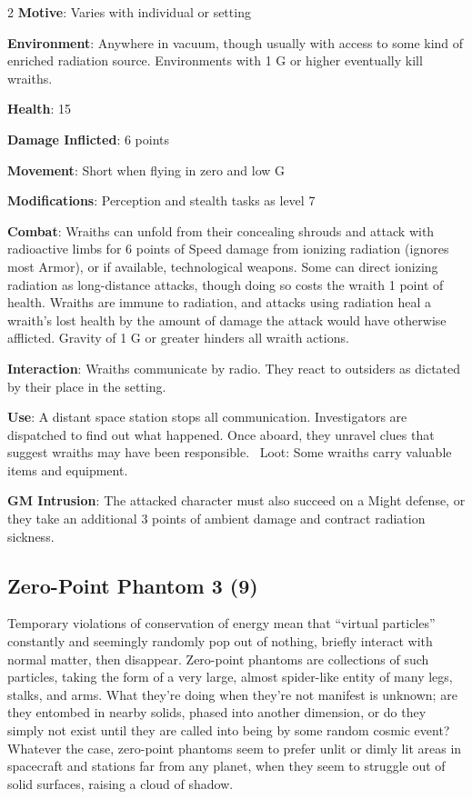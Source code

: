 \begin{multicols}{2}
\textbf{Motive}: Varies with individual or setting 

\textbf{Environment}: Anywhere in vacuum, though usually with access to some kind of enriched radiation source. Environments with 1 G or higher eventually kill wraiths. 

\textbf{Health}: 15 

\textbf{Damage Inflicted}: 6 points 

\textbf{Movement}: Short when flying in zero and low G 

\textbf{Modifications}: Perception and stealth tasks as level 7 

\textbf{Combat}: Wraiths can unfold from their concealing shrouds and attack with radioactive limbs for 6 points of Speed damage from ionizing radiation (ignores most Armor), or if available, technological weapons. Some can direct ionizing radiation as long-distance attacks, though doing so costs the wraith 1 point of health. Wraiths are immune to radiation, and attacks using radiation heal a wraith’s lost health by the amount of damage the attack would have otherwise afflicted. Gravity of 1 G or greater hinders all wraith actions. 

\textbf{Interaction}: Wraiths communicate by radio. They react to outsiders as dictated by their place in the setting. 

\textbf{Use}: A distant space station stops all communication. Investigators are dispatched to find out what happened. Once aboard, they unravel clues that suggest wraiths may have been responsible. 
Loot: Some wraiths carry valuable items and equipment.

\textbf{GM Intrusion}: The attacked character must also succeed on a Might defense, or they take an additional 3 points of ambient damage and contract radiation sickness.

\subsection{Zero-Point Phantom 3 (9)}

Temporary violations of conservation of energy mean that “virtual particles” constantly and seemingly randomly pop out of nothing, briefly interact with normal matter, then disappear. Zero-point phantoms are collections of such particles, taking the form of a very large, almost spider-like entity of many legs, stalks, and arms. What they’re doing when they’re not manifest is unknown; are they entombed in nearby solids, phased into another dimension, or do they simply not exist until they are called into being by some random cosmic event? Whatever the case, zero-point phantoms seem to prefer unlit or dimly lit areas in spacecraft and stations far from any planet, when they seem to struggle out of solid surfaces, raising a cloud of shadow. 


\end{multicols}

